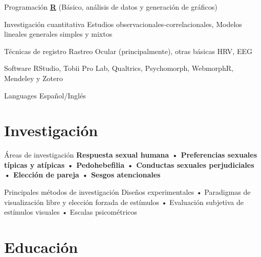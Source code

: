 \documentclass[11pt,a4paper,]{awesome-cv}
\begin{document}
\begin{cvskills}
  \cvskill
    {Programación}
    {\href{https://www.r-project.org/}{\textbf{R}} (Básico, análisis de datos y generación de gráficos)}

  \cvskill
    {Investigación cuantitativa}
    {Estudios observacionales-correlacionales, Modelos lineales generales simples y mixtos}
  
  \cvskill
    {Técnicas de registro}
    {Rastreo Ocular (principalmente), otras básicas HRV, EEG}

  \cvskill
    {Software}
    {RStudio, Tobii Pro Lab, Qualtrics, Psychomorph, WebmorphR, Mendeley y Zotero}

  \cvskill
    {Languages}
    {Español/Inglés}
\end{cvskills}

\section{Investigación}\label{investigaciuxf3n}

\begin{cvskills}
  \cvskill
    {Áreas de investigación}
    {\textbf{Respuesta sexual humana • Preferencias sexuales típicas y atípicas • Pedohebefilia • Conductas \newline sexuales perjudiciales • Elección de pareja • Sesgos atencionales}}

  \cvskill
    {Principales métodos de investigación}
    {Diseños experimentales • Paradigmas de visualización libre y elección forzada de estímulos • Evaluación \newline subjetiva de estímulos visuales • Escalas psicométricos}
\end{cvskills}

\section{Educación}\label{educaciuxf3n}
\end{document}
